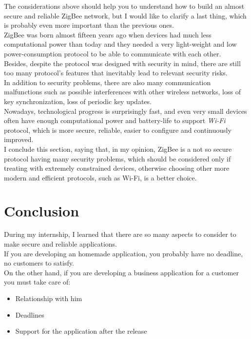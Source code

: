\documentclass[12pt]{report}
\begin{document}
{The considerations above should help you to understand how to build an almost secure and reliable ZigBee network, but I would like to clarify a last thing, which is probably even more important than the previous ones.\\
ZigBee was born almost fifteen years ago when devices had much less computational power than today and they needed a very light-weight and low power-consumption protocol to be able to communicate with each other.\\Besides, despite the protocol was designed with security in mind, there are still too many protocol's features that inevitably lead to relevant security risks.\\
In addition to security problems, there are also many communication malfunctions such as possible interferences with other wireless networks, loss of key synchronization, loss of periodic key updates.\\

Nowadays, technological progress is surprisingly fast, and even very small devices often have enough computational power and battery-life to support \emph{Wi-Fi} protocol, which is more secure, reliable, easier to configure and continuously improved.\\
I conclude this section, saying that, in my opinion, ZigBee is a not so secure protocol having many security problems, which should be considered only if treating with extremely constrained devices, otherwise choosing other more modern and efficient protocols, such as Wi-Fi, is a better choice.\\

\chapter{Conclusion}
During my internship, I learned that there are so many aspects to consider to make secure and reliable applications.\\
If you are developing an homemade application, you probably have no deadline, no customers to satisfy.\\
On the other hand, if you are developing a business application for a customer you must take care of:
\begin{itemize}
  \item Relationship with him
  \item Deadlines
  \item Support for the application after the release
\end{itemize}

}
\end{document}
